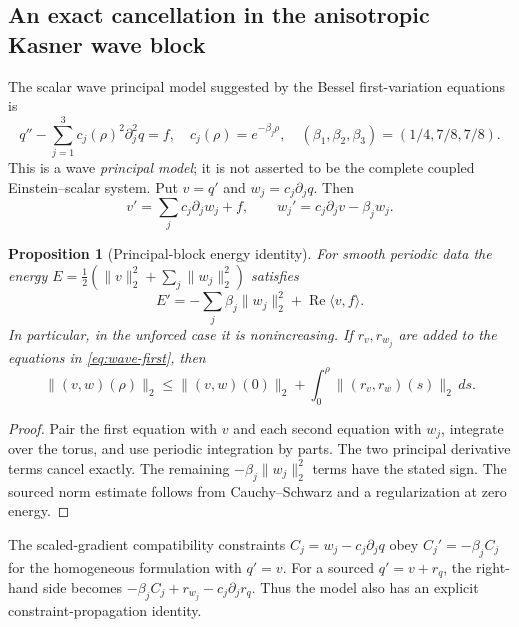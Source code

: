 \documentclass[11pt,a4paper]{article}
\newtheorem{proposition}[theorem]{Proposition}
\theoremstyle{remark}
\begin{document}
\subsection{An exact cancellation in the anisotropic Kasner wave block}
The scalar wave principal model suggested by the Bessel first-variation equations is
\begin{equation}\label{eq:kasner-wave}
q''-\sum_{j=1}^3c_j(\rho)^2\partial_j^2q=f,
\quad c_j(\rho)=e^{-\beta_j\rho},
\quad(\beta_1,\beta_2,\beta_3)=(1/4,7/8,7/8).
\end{equation}
This is a wave \emph{principal model}; it is not asserted to be the complete coupled Einstein--scalar system. Put $v=q'$ and $w_j=c_j\partial_jq$. Then
\begin{equation}\label{eq:wave-first}
v'=\sum_jc_j\partial_jw_j+f,\qquad
w_j'=c_j\partial_jv-\beta_jw_j.
\end{equation}
\begin{proposition}[Principal-block energy identity]\label{prop:waveenergy}
For smooth periodic data the energy $E=\frac12(\|v\|_2^2+\sum_j\|w_j\|_2^2)$ satisfies
\begin{equation}\label{eq:wave-energy}
E'=-\sum_j\beta_j\|w_j\|_2^2+
\operatorname{Re}\langle v,f\rangle.
\end{equation}
In particular, in the unforced case it is nonincreasing. If $r_v,r_{w_j}$ are added to the equations in \eqref{eq:wave-first}, then
\begin{equation}\label{eq:wave-residual}
\|(v,w)(\rho)\|_2\le\|(v,w)(0)\|_2
+\int_0^\rho\|(r_v,r_w)(s)\|_2\,ds.
\end{equation}
\end{proposition}
\begin{proof}
Pair the first equation with $v$ and each second equation with $w_j$, integrate over the torus, and use periodic integration by parts. The two principal derivative terms cancel exactly. The remaining $-\beta_j\|w_j\|_2^2$ terms have the stated sign. The sourced norm estimate follows from Cauchy--Schwarz and a regularization at zero energy.
\end{proof}
The scaled-gradient compatibility constraints $C_j=w_j-c_j\partial_jq$ obey $C_j'=-\beta_j C_j$ for the homogeneous formulation with $q'=v$. For a sourced $q'=v+r_q$, the right-hand side becomes $-\beta_jC_j+r_{w_j}-c_j\partial_jr_q$. Thus the model also has an explicit constraint-propagation identity.
\end{document}
